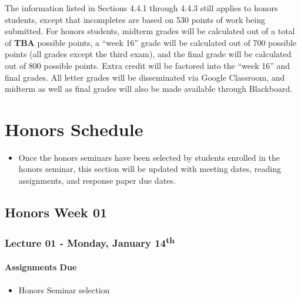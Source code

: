 \documentclass[]{book}
\providecommand{\tightlist}{%
  \setlength{\itemsep}{0pt}\setlength{\parskip}{0pt}}
\newenvironment{rmdblock}[1]
  {\begin{shaded*}
  \begin{itemize}
  \renewcommand{\labelitemi}{
    \raisebox{-.7\height}[0pt][0pt]{
      {\setkeys{Gin}{width=3em,keepaspectratio}\texttt{[image: images/\#1]}}
    }
  }
  \item
  }
  {
  \end{itemize}
  \end{shaded*}
  }
\newenvironment{rmdwarning}
  {\begin{rmdblock}{warning}}
  {\end{rmdblock}}
\begin{document}
The information listed in Sections 4.4.1 through 4.4.3 still applies to honors students, except that incompletes are based on 530 points of work being submitted. For honors students, midterm grades will be calculated out of a total of \textbf{TBA} possible points, a ``week 16'' grade will be calculated out of 700 possible points (all grades except the third exam), and the final grade will be calculated out of 800 possible points. Extra credit will be factored into the ``week 16'' and final grades. All letter grades will be disseminated via Google Classroom, and midterm as well as final grades will also be made available through Blackboard.

\hypertarget{honors-schedule}{%
\chapter{Honors Schedule}\label{honors-schedule}}

\begin{rmdwarning}
Once the honors seminars have been selected by students enrolled in the
honors seminar, this section will be updated with meeting dates, reading
assignments, and response paper due dates.
\end{rmdwarning}

\hypertarget{honors-week-01}{%
\section*{Honors Week 01}\label{honors-week-01}}

\hypertarget{lecture-01---monday-january-14th}{%
\subsection*{\texorpdfstring{Lecture 01 - Monday, January 14\textsuperscript{th}}{Lecture 01 - Monday, January 14th}}\label{lecture-01---monday-january-14th}}

\hypertarget{assignments-due-6}{%
\subsubsection*{Assignments Due}\label{assignments-due-6}}

\begin{itemize}
\tightlist
\item
  Honors Seminar selection
\end{itemize}
\end{document}
